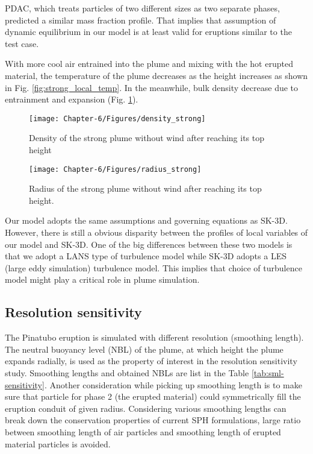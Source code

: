 PDAC, which treats particles of two different sizes as two separate phases, predicted a similar mass fraction profile. That implies that assumption of dynamic equilibrium in our model is at least valid for eruptions similar to the test case.

With more cool air entrained into the plume and mixing with the hot erupted material, the temperature of the plume decreases as the height increases as shown in Fig. \ref{fig:strong_local_temp}. In the meanwhile, bulk density decrease due to entrainment and expansion (Fig. \ref{fig:strong_local_density}).
\begin{figure}
\center
\texttt{[image: Chapter-6/Figures/density\_strong]}
\caption{Density of the strong plume without wind after reaching its top height}
\label{fig:strong_local_density}
\end{figure}
\begin{figure}
\center
\texttt{[image: Chapter-6/Figures/radius\_strong]}
\caption{Radius of the strong plume without wind after reaching its top height.}
\label{fig:strong_local_radius}
\end{figure}
Our model adopts the same assumptions and governing equations as SK-3D. However, there is still a obvious disparity between the profiles of local variables of our model and SK-3D. One of the big differences between these two models is that we adopt a LANS type of turbulence model while SK-3D adopts a LES (large eddy simulation) turbulence model. This implies that choice of  turbulence model might play a critical role in plume simulation.

\subsection{Resolution sensitivity}
The Pinatubo eruption is simulated with different resolution (smoothing length). The neutral buoyancy level (NBL) of the plume, at which height the plume expands radially, is used as the property of interest in the resolution sensitivity study. Smoothing lengths and obtained NBLs are list in the Table \ref{tab:sml-sensitivity}. Another consideration while picking up smoothing length is to make sure that particle for phase 2 (the erupted material) could symmetrically fill the eruption conduit of given radius. Considering various smoothing lengths can break down the conservation properties of current SPH formulations, large ratio between smoothing length of air particles and smoothing length of erupted material particles is avoided.

